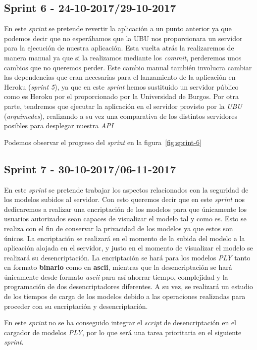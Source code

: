 \subsection{Sprint 6 - 24-10-2017/29-10-2017}
En este \textit{sprint} se pretende revertir la aplicación a un punto anterior ya que podemos decir que no esperábamos que la UBU nos proporcionara un servidor para la ejecución de nuestra aplicación. Esta vuelta atrás la realizaremos de manera manual ya que si la realizamos mediante los \textit{commit}, perderemos unos cambios que no queremos perder. Este cambio manual también involucra cambiar las dependencias que eran necesarias para el lanzamiento de la aplicación en Heroku (\textit{sprint 5}), ya que en este \textit{sprint} hemos sustituido un servidor público como es Heroku por el proporcionado por la Universidad de Burgos. Por otra parte, tendremos que ejecutar la aplicación en el servidor provisto por la \textit{UBU} (\textit{arquimedes}), realizando a su vez una comparativa de los distintos servidores posibles para desplegar nuestra \textit{API}

Podemos observar el progreso del \textit{sprint} en la figura~\ref{fig:sprint-6}

\subsection{Sprint 7 - 30-10-2017/06-11-2017}
En este \textit{sprint} se pretende trabajar los aspectos relacionados con la seguridad de los modelos subidos al servidor. Con esto queremos decir que en este \textit{sprint} nos dedicaremos a realizar una encriptación de los modelos para que únicamente los usuarios autorizados sean capaces de visualizar el modelo tal y como es. Esto se realiza con el fin de conservar la privacidad de los modelos ya que estos son únicos.
La encriptación se realizará en el momento de la subida del modelo a la aplicación alojada en el servidor, y justo en el momento de visualizar el modelo se realizará su desencriptación. La encriptación se hará para los modelos \textit{PLY} tanto en formato \textbf{binario} como en \textbf{ascii}, mientras que la desencriptación se hará únicamente desde formato \textit{ascii} para así ahorrar tiempo, complejidad y la programación de dos desencriptadores diferentes. A su vez, se realizará un estudio de los tiempos de carga de los modelos debido a las operaciones realizadas para proceder con su encriptación y desencriptación.

En este \textit{sprint} no se ha conseguido integrar el \textit{script} de desencriptación en el cargador de modelos \textit{PLY}, por lo que será una tarea prioritaria en el siguiente \textit{sprint}.

